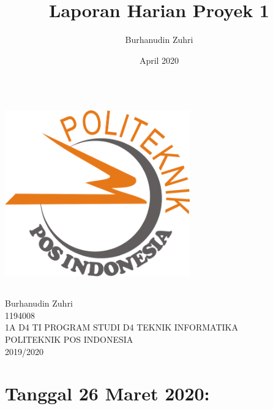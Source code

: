 \documentclass{article}
\title{Laporan Harian Proyek 1}
\author{Burhanudin Zuhri}
\date{April 2020}
\begin{document}
\maketitle
	\begin{center}
		\includegraphics[width=8cm,height=8cm]{logo.png}
	\end{center}
	\vspace{0.5 cm}
	
	\begin{center}
		Burhanudin Zuhri \\
		1194008 \\
		1A D4 TI \linebreak
		\newline
		\newline
		\newline
		\linebreak
		\newline
		\newline
		PROGRAM STUDI D4 TEKNIK INFORMATIKA \\
		POLITEKNIK POS INDONESIA\\
		2019/2020\\
	\end{center}

\section{Tanggal 26 Maret 2020:}
\end{document}
